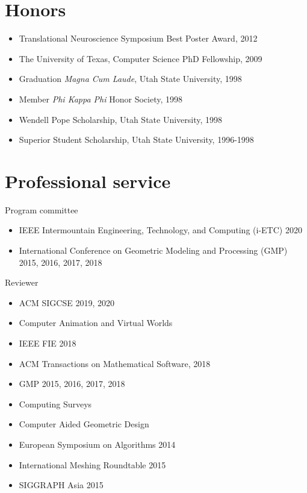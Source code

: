 \documentclass[margin,line]{res}
\begin{document}
\begin{resume}
\section{\sc Honors}
\begin{itemize}[label={},leftmargin=0pt]
  \setlength\itemsep{0em}
  \item Translational Neuroscience Symposium Best Poster Award, 2012 %
  \item The University of Texas, Computer Science PhD Fellowship, 2009 %
  \item Graduation \emph{Magna Cum Laude}, Utah State University, 1998
  \item Member \emph{Phi Kappa Phi} Honor Society, 1998
  \item Wendell Pope Scholarship, Utah State University, 1998
  \item Superior Student Scholarship, Utah State University, 1996-1998
\end{itemize}

\begin{LONG}
\end{LONG}

\section{\sc Professional service}
Program committee
\vspace{2mm}
\begin{itemize}[label={},leftmargin=5mm]
  \item IEEE Intermountain Engineering, Technology, and Computing (i-ETC) 2020
  \item International Conference on Geometric Modeling and Processing (GMP) 2015, 2016, 2017, 2018
\end{itemize}

Reviewer
\vspace{2mm}
\begin{itemize}[label={},leftmargin=5mm]
  \item ACM SIGCSE 2019, 2020
  \item Computer Animation and Virtual Worlds
  \item IEEE FIE 2018
  \item ACM Transactions on Mathematical Software, 2018
  \item GMP 2015, 2016, 2017, 2018
  \item Computing Surveys
  \item Computer Aided Geometric Design
  \item European Symposium on Algorithms 2014
  \item International Meshing Roundtable 2015
  \item SIGGRAPH Asia 2015
\end{itemize}


\end{resume}
\end{document}
